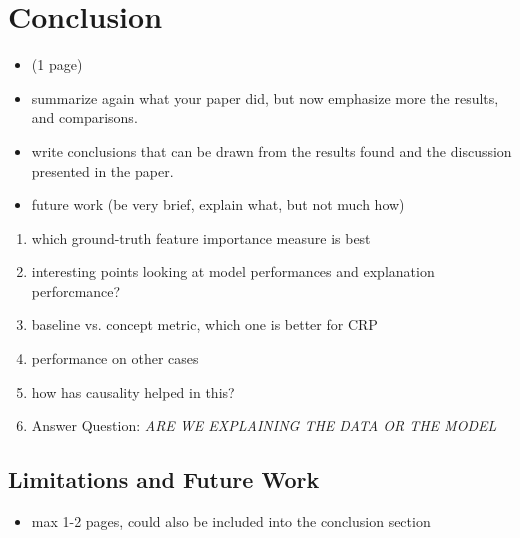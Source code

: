 \chapter{Conclusion}\label{chapter:conclusion}

{ \color{red}
    \begin{itemize}
        \item (1 page)
        \item summarize again what your paper did, but now emphasize more the results, and comparisons.
        \item write conclusions that can be drawn from the results found and the discussion presented in the paper.
        \item future work (be very brief, explain what, but not much how)
    \end{itemize}
}
\begin{enumerate}
    \item which ground-truth feature importance measure is best
    \item interesting points looking at model performances and explanation perforcmance?
    \item baseline vs. concept metric, which one is better for CRP
    \item performance on other cases
    \item how has causality helped in this?
    \item Answer Question: \textit{ARE WE EXPLAINING THE DATA OR THE MODEL} 
\end{enumerate}

\section*{Limitations and Future Work}


{ \color{red}
    \begin{itemize}
        \item max 1-2 pages, could also be included into the conclusion section 
    \end{itemize}
}